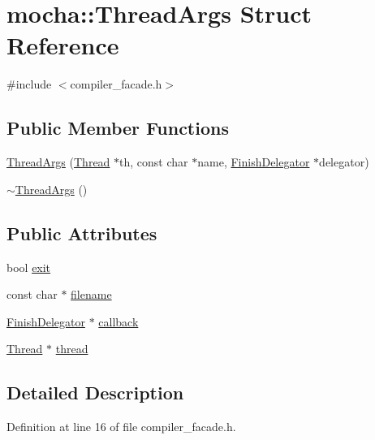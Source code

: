 \hypertarget{structmocha_1_1_thread_args}{
\section{mocha::ThreadArgs Struct Reference}
\label{structmocha_1_1_thread_args}
}


{\ttfamily \#include $<$compiler\_\-facade.h$>$}

\subsection*{Public Member Functions}
\begin{DoxyCompactItemize}
\item 
\hyperlink{structmocha_1_1_thread_args_a3279995f47cb854b02579434a598bfa0}{ThreadArgs} (\hyperlink{classmocha_1_1_thread}{Thread} $\ast$th, const char $\ast$name, \hyperlink{classmocha_1_1_finish_delegator}{FinishDelegator} $\ast$delegator)
\item 
\hyperlink{structmocha_1_1_thread_args_a69738cd8a2430289d99a747af5f164f6}{$\sim$ThreadArgs} ()
\end{DoxyCompactItemize}
\subsection*{Public Attributes}
\begin{DoxyCompactItemize}
\item 
bool \hyperlink{structmocha_1_1_thread_args_aa0ce52a87d3abe5d7a94d6ab1b050813}{exit}
\item 
const char $\ast$ \hyperlink{structmocha_1_1_thread_args_a49947d08afea2ba71b4aa06397125a30}{filename}
\item 
\hyperlink{classmocha_1_1_finish_delegator}{FinishDelegator} $\ast$ \hyperlink{structmocha_1_1_thread_args_adbb837e9834cc81276dc5dbc3d6fb01e}{callback}
\item 
\hyperlink{classmocha_1_1_thread}{Thread} $\ast$ \hyperlink{structmocha_1_1_thread_args_a7d95fa5b63ed190b2f1c3acd6a77aaec}{thread}
\end{DoxyCompactItemize}


\subsection{Detailed Description}


Definition at line 16 of file compiler\_\-facade.h.



